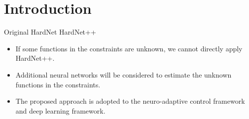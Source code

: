 \chapter{Introduction}

Original HardNet \cite{Min:2025aa}
HardNet++ \cite{Goertzen:2026aa}

\begin{itemize}
  \item If some functions in the constraints are unknown, we cannot directly apply HardNet++.
  \item Additional neural networks will be considered to estimate the unknown functions in the constraints.
  \item The proposed approach is adopted to the neuro-adaptive control framework and deep learning framework.
\end{itemize}